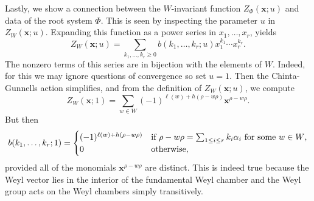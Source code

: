     Lastly, we show a connection between the $W$-invariant function $Z_{\Phi}(\mathbf{x};u)$ and data of the root system $\Phi$. This is seen by inspecting the parameter $u$ in $Z_{W}(\mathbf{x};u)$. Expanding this function as a power series in $x_{1},\ldots,x_{r}$, yields
    \[
        Z_{W}(\mathbf{x};u) = \sum_{k_{1},\ldots,k_{r} \ge 0}b(k_{1},\ldots,k_{r};u)x_{1}^{k_{1}} \cdots x_{r}^{k_{r}}.
    \]
    The nonzero terms of this series are in bijection with the elements of $W$. Indeed, for this we may ignore questions of convergence so set $u = 1$. Then the Chinta-Gunnells action simplifies, and from the definition of $Z_{W}(\mathbf{x};u)$, we compute
    \[
        Z_{W}(\mathbf{x};1) = \sum_{w \in W}(-1)^{\ell(w)+h(\rho-w\rho)}\mathbf{x}^{\rho-w\rho}.
    \]
    But then
    \[
        b(k_{1},\ldots,k_{r};1) = \begin{cases} (-1)^{\ell(w)+h(\rho-w\rho)} & \text{if $\rho-w\rho = \sum_{1 \le i \le r}k_{i}\alpha_{i}$ for some $w \in W$}, \\ 0 & \text{otherwise}, \end{cases}
    \]
    provided all of the monomials $\mathbf{x}^{\rho-w\rho}$ are distinct. This is indeed true because the Weyl vector lies in the interior of the fundamental Weyl chamber and the Weyl group acts on the Weyl chambers simply transitively.

